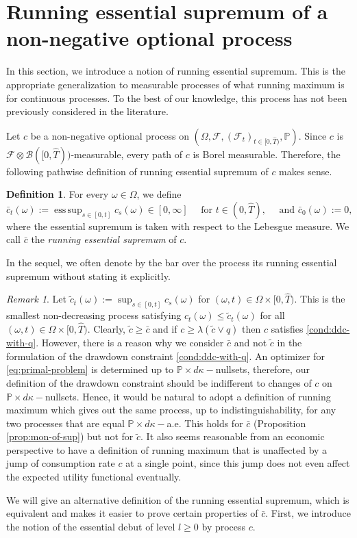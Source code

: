 \documentclass[11pt, oneside]{article}   	%
\DeclareMathOperator*{\esssup}{ess\,sup}
\theoremstyle{plain}
\theoremstyle{definition}
\newtheorem{defn}[thm]{Definition}
\theoremstyle{remark}
\newtheorem{rem}[thm]{Remark}
\begin{document}

\section{Running essential supremum of a non-negative optional process}\label{sec:run-esssup}
In this section, we introduce a notion of running essential supremum. This is the appropriate generalization to measurable processes of what running maximum is for continuous processes. To the best of our knowledge, this process has not been previously considered in the literature.

Let $c$ be a non-negative optional process on $(\Omega,\mathcal{F},(\mathcal{F}_t)_{t\in[0,\hat{T})},\mathbb{P})$. Since $c$ is $\mathcal{F}\otimes\mathcal{B}([0,\hat{T}))$-measurable, every path of $c$ is Borel measurable. Therefore, the following pathwise definition of running essential supremum of $c$ makes sense.
\begin{defn}\label{def:running-max}
For every $\omega\in\Omega$, we define
$$\bar{c}_t(\omega):=\esssup_{s\in[0,t]}c_s(\omega)\in[0,\infty]\quad \text{ for } t\in(0,\hat{T}),\quad\text{ and } \bar{c}_0(\omega):=0,$$
where the essential supremum is taken with respect to the Lebesgue measure. We call $\bar{c}$ the \textit{running essential supremum} of $c$.
\end{defn}
In the sequel, we often denote by the bar over the process its running essential supremum without stating it explicitly.

\begin{rem} Let $\tilde{c}_t(\omega):=\sup_{s\in[0,t]}c_s(\omega)$ for $(\omega,t)\in\Omega\times[0,\hat{T})$. This is the smallest non-decreasing process satisfying $c_t(\omega)\leq\tilde{c}_t(\omega)$ for all $(\omega,t)\in\Omega\times[0,\hat{T})$. Clearly, $\tilde{c}\geq \bar{c}$ and if $c\geq \lambda(\tilde{c}\vee q)$ then $c$ satisfies \eqref{cond:ddc-with-q}. However, there is a reason why we consider $\bar{c}$ and not $\tilde{c}$ in the formulation of the drawdown constraint \eqref{cond:ddc-with-q}. An optimizer for \eqref{eq:primal-problem} is determined up to $\mathbb{P}\times d\kappa-$nullsets, therefore, our definition of the drawdown constraint should be indifferent to changes of $c$  on $\mathbb{P}\times d\kappa-$nullsets. Hence, it would be natural to adopt a definition of running maximum which gives out the same process, up to indistinguishability, for any two processes that are equal $\mathbb{P}\times d\kappa-$a.e. This holds for $\bar{c}$ (Proposition \ref{prop:mon-of-sup}) but not for $\tilde{c}$. It also seems reasonable from an economic perspective to have a definition of running maximum that is unaffected by a jump of consumption rate $c$ at a single point, since this jump does not even affect the expected utility functional eventually.
\end{rem}
We will give an alternative definition of the running essential supremum, which is equivalent and makes it easier to prove certain properties of $\bar{c}$. First, we introduce the notion of the essential debut of level $l\geq 0$ by process $c$.
\end{document}
